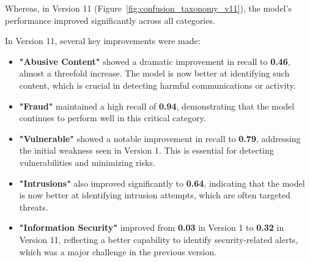 Whereas, in Version 11 (Figure~\ref{fig:confusion_taxonomy_v11}), the model's performance improved significantly across all categories.

In Version 11, several key improvements were made:

\begin{itemize}
    \item \textbf{"Abusive Content"} showed a dramatic improvement in recall to \textbf{0.46}, almost a threefold increase. The model is now better at identifying such content, which is crucial in detecting harmful communications or activity.
    \item \textbf{"Fraud"} maintained a high recall of \textbf{0.94}, demonstrating that the model continues to perform well in this critical category.
    \item \textbf{"Vulnerable"} showed a notable improvement in recall to \textbf{0.79}, addressing the initial weakness seen in Version 1. This is essential for detecting vulnerabilities and minimizing risks.
    \item \textbf{"Intrusions"} also improved significantly to \textbf{0.64}, indicating that the model is now better at identifying intrusion attempts, which are often targeted threats.
    \item \textbf{"Information Security"} improved from \textbf{0.03} in Version 1 to \textbf{0.32} in Version 11, reflecting a better capability to identify security-related alerts, which was a major challenge in the previous version.
\end{itemize}

